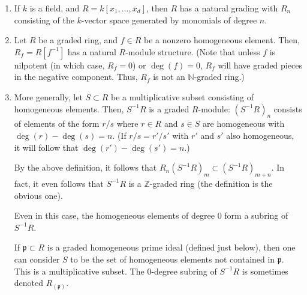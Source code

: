\documentclass[12pt]{article}
\begin{document}
\begin{ex}
	\begin{enumerate}
		\item If $k$ is a field, and $R = k[x_{1}, \ldots, x_{d}]$, then $R$ has a natural grading with $R_{n}$ consisting of the $k$-vector space generated by monomials of degree $n$. 
		\item Let $R$ be a graded ring, and $f \in R$ be a nonzero homogeneous element. Then, $R_{f} = R[f^{-1}]$ has a natural $R$-module structure. (Note that unless $f$ is nilpotent (in which case, $R_{f} = 0$) or $\deg(f) = 0$, $R_{f}$ will have graded pieces in the negative component. Thus, $R_{f}$ is not an $\mathbb{N}$-graded ring.)
		\item More generally, let $S \subset R$ be a multiplicative subset consisting of homogeneous elements. Then, $S^{-1}R$ is a graded $R$-module: $(S^{-1} R)_{n}$ consists of elements of the form $r/s$ where $r \in R$ and $s \in S$ are homogeneous with $\deg(r) - \deg(s) = n$. (If $r/s = r'/s'$ with $r'$ and $s'$ also homogeneous, it will follow that $\deg(r') - \deg(s') = n$.) 

		By the above definition, it follows that $R_{n} (S^{-1} R)_{m} \subset (S^{-1} R)_{m + n}$. In fact, it even follows that $S^{-1}R$ is a $\mathbb{Z}$-graded ring (the definition is the obvious one). 

		Even in this case, the homogeneous elements of degree $0$ form a subring of $S^{-1} R$. 

		If $\mathfrak{p} \subset R$ is a graded homogeneous prime ideal (defined just below), then one can consider $S$ to be the set of homogeneous elements not contained in $\mathfrak{p}$. This is a multiplicative subset. The $0$-degree subring of $S^{-1} R$ is sometimes denoted $R_{(\mathfrak{p})}$.	
	\end{enumerate}
\end{ex}
\end{document}
